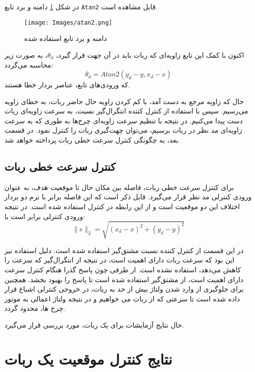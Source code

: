 در شکل \ref{Fig atan2} دامنه و برد تابع \verb|Atan2| قابل مشاهده است.
\begin{figure}[!h] 
	\centering
	\texttt{[image: Images/atan2.png]}
	\caption{دامنه و برد تابع استفاده شده} \label{Fig atan2}
\end{figure}

اکنون با کمک این تابع زاویه‌ای که ربات باید در آن جهت قرار گیرد، $\theta_d$، به صورت زیر محاسبه می‌گردد:
\begin{equation}
\theta_d = Atan2(y_d - y, x_d - x)
\end{equation}
که ورودی‌های تابع، عناصر بردار خطا هستند.

حال که زاویه مرجع به دست آمد، با کم کردن زاویه حال حاضر ربات، به خطای زاویه می‌رسیم. سپس با استفاده از کنترل کننده انتگرال‌گیر نسبت، به سرعت زاویه‌ای ربات دست پیدا می‌کنیم. در نتیجه با تنظیم سرعت زاویه‌ای چرخ‌ها به طوری که به سرعت زاویه‌ای مد نظر در ربات برسیم، می‌توان چهت‌گیری ربات را کنترل نمود. در قسمت بعد، به چگونگی کنترل سرعت خطی ربات پرداخته خواهد شد. 

\subsection{کنترل سرعت خطی ربات}
برای کنترل سرعت خطی ربات، فاصله بین مکان حال تا موفعیت هدف، به عنوان ورودی کنترلی مد نظر قرار می‌گیرد. قابل ذکر است که این فاصله برابر با نرم دو بردار اختلاف این دو موقعیت است و از این رابطه در کنترل استفاده شده است. در نتیجه ورودی کنترلی برابر است با:
\begin{equation}
\|e\|_2 = \sqrt{(x_d - x)^{2} + (y_d - y)^{2}}
\end{equation}

در این قسمت از کنترل کننده نسبت مشتق‌گیر استفاده شده است. دلیل استفاده نیز این بود که سرعت ربات دارای اهمیت است، در نتیجه از انتگرال‌گیر که سرعت را کاهش می‌دهد، استفاده نشده است. ار طرفی چون پاسخ گذرا هنگام کنترل سرعت دارای اهمیت است، از مشتق‌گیر استفاده شده است تا پاسخ را بهبود بخشد. همچنین برای جلوگیری از وارد شدن ولتاژ بیش از حد به ربات، در خروجی کنترلی اشباع قرار داده شده است تا سرعتی که از ربات می خواهیم و در نتیجه ولتاژ اعمالی به موتور چرخ ها، محدود گردد.

حال نتایج آزمایشات برای یک ربات، مورد بررسی قرار می‌گیرد.

\section{نتایج کنترل موقعیت یک ربات}

 
